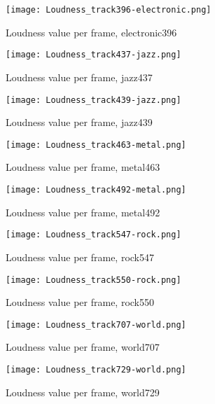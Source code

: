 \documentclass{article} %
\begin{document}
\begin{figure}
\centering
\texttt{[image: Loudness\_track396-electronic.png]}
\caption{Loudness value per frame, electronic396}
\label{fig:loudness_396}
\end{figure}

\begin{figure}
\centering
\texttt{[image: Loudness\_track437-jazz.png]}
\caption{Loudness value per frame, jazz437}
\label{fig:loudness_437}
\end{figure}

\begin{figure}
\centering
\texttt{[image: Loudness\_track439-jazz.png]}
\caption{Loudness value per frame, jazz439}
\label{fig:loudness_439}
\end{figure}

\begin{figure}
\centering
\texttt{[image: Loudness\_track463-metal.png]}
\caption{Loudness value per frame, metal463}
\label{fig:loudness_463}
\end{figure}


\begin{figure}
\centering
\texttt{[image: Loudness\_track492-metal.png]}
\caption{Loudness value per frame, metal492}
\label{fig:loudness_492}
\end{figure}


\begin{figure}
\centering
\texttt{[image: Loudness\_track547-rock.png]}
\caption{Loudness value per frame, rock547}
\label{fig:loudness_547}
\end{figure}


\begin{figure}
\centering
\texttt{[image: Loudness\_track550-rock.png]}
\caption{Loudness value per frame, rock550}
\label{fig:loudness_550}
\end{figure}


\begin{figure}
\centering
\texttt{[image: Loudness\_track707-world.png]}
\caption{Loudness value per frame, world707}
\label{fig:loudness_707}
\end{figure}


\begin{figure}
\centering
\texttt{[image: Loudness\_track729-world.png]}
\caption{Loudness value per frame, world729}
\label{fig:loudness_729}
\end{figure}



\end{document}
